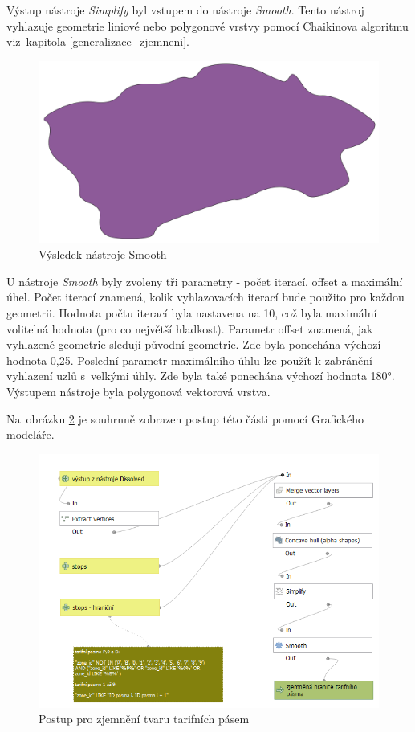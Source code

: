 Výstup nástroje \textit{Simplify} byl vstupem do nástroje \textit{Smooth}. Tento nástroj vy\-hlazuje geometrie
liniové nebo polygonové vrstvy pomocí Chaikinova algoritmu viz~ka\-pitola \ref{generalizace_zjemneni}.

\begin{figure}[H] \centering
    \includegraphics[width=400pt]{./pictures/smooth-P0B.png}
    \caption[Výsledek nástroje Smooth]{Výsledek nástroje Smooth}
	\label{fig:smooth-P0B}                                
\end{figure}

U nástroje \textit{Smooth} byly zvoleny tři parametry - počet iterací, offset a maximální úhel.
Počet iterací znamená, kolik vyhlazovacích iterací bude použito pro každou geometrii.
Hodnota počtu iterací byla nastavena na 10, což byla maximální volitelná hodnota (pro co největší hladkost).
Parametr offset znamená, jak  vyhlazené geometrie sledují původní geometrie.
Zde byla ponechána výchozí hodnota 0,25. Poslední parametr maximálního úhlu lze použít
k zabránění vyhlazení uzlů s~velkými úhly. Zde byla také ponechána výchozí hodnota 180°.
Výstupem nástroje byla polygonová vektorová vrstva.

Na~obrá\-zku \ref{fig:postup-smooth} je souhrnně zobrazen postup této části pomocí Grafického modeláře.

\begin{figure}[H] \centering
    \includegraphics[width=400pt]{./pictures/postup-smooth.png}
    \caption[Postup pro zjemnění tvaru tarifních pásem]{Postup pro zjemnění tvaru tarifních pásem}
	\label{fig:postup-smooth}              
\end{figure}

